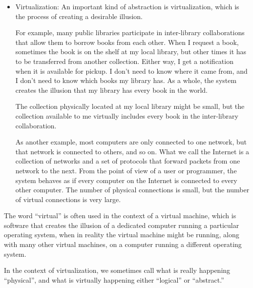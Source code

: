 \documentclass[12pt]{book}
\begin{document}
{\begin{itemize}
Similarly, when you use a web browser, you understand that when
you click on a link, the browser displays the page the link refers
to.  The software and network communication that make that possible
are complex, but as a user, you don't have to know the
details.

A large part of software engineering is designing abstractions like
these that allow users and other programmers to use powerful
and complicated systems without having to know about the details
of their implementation.

\item Virtualization: An important kind of abstraction is
virtualization, which is the process of creating a desirable
illusion.

For example, many public libraries participate in inter-library
collaborations that allow them to borrow books from each other.
When I request a book, sometimes the book is on the shelf at my
local library, but other times it has to be transferred from another
collection.  Either way, I get a notification when it is available
for pickup.  I don't need to know where it came from, and I don't
need to know which books my library has.  As a whole, the system
creates the illusion that my library has every book in the world.

The collection physically located at my local library might be small,
but the collection available to me virtually includes every book
in the inter-library collaboration.

As another example, most computers are only connected to one
network, but that network is connected to others, and so on.  What
we call the Internet is a collection of networks and a set of
protocols that forward packets from one network to the next.
From the point of view of a user or programmer, the system behaves
as if every computer on the Internet is connected to every other
computer.  The number of physical connections is small, but the
number of virtual connections is very large.

\end{itemize}

The word ``virtual'' is often used in the context of a virtual
machine, which is software that creates the illusion of a dedicated
computer running a particular operating system, when in reality
the virtual machine might be running, along with many other virtual
machines, on a computer running a different operating system.

In the context of virtualization, we sometimes call what is
really happening ``physical'', and what is virtually happening
either ``logical'' or ``abstract.''


}
\end{document}
